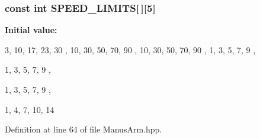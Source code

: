 \subsubsection[{\-S\-P\-E\-E\-D\-\_\-\-L\-I\-M\-I\-T\-S}]{\setlength{\rightskip}{0pt plus 5cm}const int {\bf \-S\-P\-E\-E\-D\-\_\-\-L\-I\-M\-I\-T\-S}[$\,$][5]}\label{ManusArm_8hpp_a48c715826efb7a9627e336881fb9441a}
{\bfseries \-Initial value\-:}
\begin{DoxyCode}
 { { 3, 10, 17, 23, 30 },  
                                                            { 10, 30, 50, 70, 
      90 }, 
                                                            { 10, 30, 50, 70, 
      90 }, 
                                                            { 1, 3, 5, 7, 9 }, 
           
                                                            { 1, 3, 5, 7, 9 }, 
           
                                                            { 1, 3, 5, 7, 9 }, 
           
                                                            { 1, 4, 7, 10, 14 }
       }
\end{DoxyCode}


\-Definition at line 64 of file \-Manus\-Arm.\-hpp.

